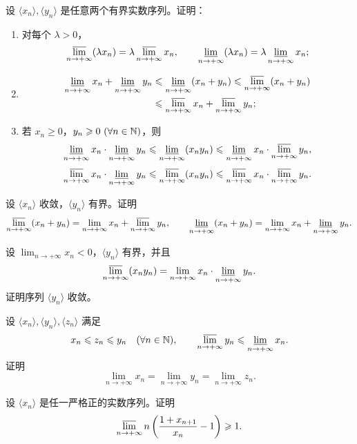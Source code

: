 \begin{exercise}
\item 设 \(\langle x_n\rangle,\langle y_n\rangle\) 是任意两个有界实数序列。证明：
\begin{enumerate}[label=\arabic*)]
  \item 对每个 \(\lambda>0\)，
  \[
  \varlimsup_{n\to+\infty}(\lambda x_n)=\lambda\varlimsup_{n\to+\infty}x_n,\qquad
  \varliminf_{n\to+\infty}(\lambda x_n)=\lambda\varliminf_{n\to+\infty}x_n;
  \]
  \item
  \[
  \begin{aligned}
  \varliminf_{n\to+\infty}x_n+\varliminf_{n\to+\infty}y_n
  &\leqslant\varliminf_{n\to+\infty}(x_n+y_n)
  \leqslant\varlimsup_{n\to+\infty}(x_n+y_n)\\
  &\leqslant\varlimsup_{n\to+\infty}x_n+\varlimsup_{n\to+\infty}y_n;
  \end{aligned}
  \]
  \item 若 \(x_n\geqslant0\)，\(y_n\geqslant0\ (\forall n\in\mathbb{N})\)，则
  \[
  \varliminf_{n\to+\infty}x_n\cdot\varliminf_{n\to+\infty}y_n
  \leqslant\varliminf_{n\to+\infty}(x_ny_n)
  \leqslant\varliminf_{n\to+\infty}x_n\cdot\varlimsup_{n\to+\infty}y_n,
  \]
  \[
  \varlimsup_{n\to+\infty}x_n\cdot\varliminf_{n\to+\infty}y_n
  \leqslant\varlimsup_{n\to+\infty}(x_ny_n)
  \leqslant\varlimsup_{n\to+\infty}x_n\cdot\varlimsup_{n\to+\infty}y_n.
  \]
\end{enumerate}
\end{exercise}

\begin{exercise}
\item 设 \(\langle x_n\rangle\) 收敛，\(\langle y_n\rangle\) 有界。证明
\[
\varlimsup_{n\to+\infty}(x_n+y_n)=\lim_{n\to+\infty}x_n+\varlimsup_{n\to+\infty}y_n,\qquad
\varliminf_{n\to+\infty}(x_n+y_n)=\lim_{n\to+\infty}x_n+\varliminf_{n\to+\infty}y_n.
\]
\end{exercise}

\begin{exercise}
\item 设 \(\lim_{n\to+\infty}x_n<0\)，\(\langle y_n\rangle\) 有界，并且
\[
\varlimsup_{n\to+\infty}(x_ny_n)=\lim_{n\to+\infty}x_n\cdot\varliminf_{n\to+\infty}y_n.
\]
证明序列 \(\langle y_n\rangle\) 收敛。
\end{exercise}

\begin{exercise}
\item 设 \(\langle x_n\rangle,\langle y_n\rangle,\langle z_n\rangle\)
满足
\[
x_n\leqslant z_n\leqslant y_n\quad(\forall n\in\mathbb{N}),\qquad
\varlimsup_{n\to+\infty}y_n\leqslant\varliminf_{n\to+\infty}x_n.
\]
证明
\[
\lim_{n\to+\infty}x_n=\lim_{n\to+\infty}y_n=\lim_{n\to+\infty}z_n.
\]
\end{exercise}

\begin{exercise}
\item 设 \(\langle x_n\rangle\) 是任一严格正的实数序列。证明
\[
\varlimsup_{n\to+\infty}
n\left(\frac{1+x_{n+1}}{x_n}-1\right)\geqslant1.
\]
\end{exercise}
